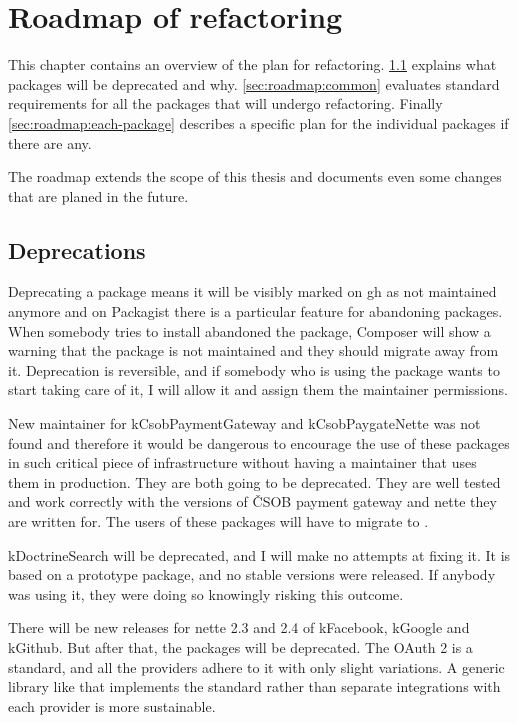 \chapter{Roadmap of refactoring} \label{sec:roadmap}

This chapter contains an overview of the plan for refactoring. \ref{sec:roadmap:deprecations} explains what packages will be deprecated and why. \ref{sec:roadmap:common} evaluates standard requirements for all the packages that will undergo refactoring. Finally \ref{sec:roadmap:each-package} describes a specific plan for the individual packages if there are any.

The roadmap extends the scope of this thesis and documents even some changes that are planed in the future.

\section{Deprecations} \label{sec:roadmap:deprecations}

Deprecating a package means it will be visibly marked on \gls{gh} as not maintained anymore and on Packagist there is a particular feature for abandoning packages. When somebody tries to install abandoned the package, Composer will show a warning that the package is not maintained and they should migrate away from it. Deprecation is reversible, and if somebody who is using the package wants to start taking care of it, I will allow it and assign them the maintainer permissions.

New maintainer for \gls{kCsobPaymentGateway} and \gls{kCsobPaygateNette} was not found and therefore it would be dangerous to encourage the use of these packages in such critical piece of infrastructure without having a maintainer that uses them in production. They are both going to be deprecated. They are well tested and work correctly with the versions of ČSOB payment gateway and \gls{nette} they are written for. The users of these packages will have to migrate to .

\gls{kDoctrineSearch} will be deprecated, and I will make no attempts at fixing it. It is based on a prototype package, and no stable versions were released. If anybody was using it, they were doing so knowingly risking this outcome.

There will be new releases for \gls{nette} 2.3 and 2.4 of \gls{kFacebook}, \gls{kGoogle} and \gls{kGithub}. But after that, the packages will be deprecated. The OAuth 2 is a standard, and all the providers adhere to it with only slight variations. A generic library like  that implements the standard rather than separate integrations with each provider is more sustainable.

